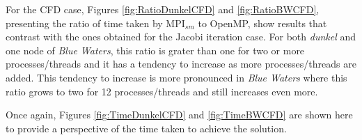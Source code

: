 For the CFD case, Figures \ref{fig:RatioDunkelCFD} and \ref{fig:RatioBWCFD}, presenting the ratio of time taken by MPI$_{sm}$ to OpenMP, show results that contrast with the ones obtained for the Jacobi iteration case. For both \emph{dunkel} and one node of \emph{Blue Waters}, this ratio is grater than one for two or more processes/threads and it has a tendency to increase as more processes/threads are added. This tendency to increase is more pronounced in \emph{Blue Waters} where this ratio grows to two for 12 processes/threads and still increases even more.

Once again, Figures \ref{fig:TimeDunkelCFD} and \ref{fig:TimeBWCFD} are shown here to provide a perspective of the time taken to achieve the solution. 

\medskip

\begin{comment}
\subsubsection*{Partial improvement using node topology}

Information about hardware threads, core, cache, socket topology can help to implement binding between cores and processes/threads. It is known that applications with frequent synchronization between "neighboring" processes/threads could profit from placing them close together. To test this idea, a simple tool called \emph{\textbf{taskset}} was used in \emph{dunkel} in a setting similar to the one used to produce Figure \ref{fig:Figure3}. This particular computer (\emph{dunkel}) has two sockets, each having 12 cores, for a total of 24 cores, each corresponding to the 24 processes/threads shown in Figures \ref{fig:Figure1} and \ref{fig:Figure3}. The 12 cores in one socket of \emph{dunkel} shared 30 Mbi of L3 cache. A new experiment was set to run within a single socket using the '-c 0-11' parameter of taskset. 

The results of this new experiment are shown in Figure \ref{fig:taskset}. Notice that only 12 processes/threads are uses. 

\medskip


\begin{figure} [h!]
    \centering
    \captionsetup{justification=raggedright, singlelinecheck=false}
    \begin{subfigure}{.6\textwidth}
      \hspace*{-1.5cm} 
      \texttt{[image: Plots/section3.2/dunkel-DP-1SoketRatio.pdf]}
      \caption{Computational Fluid Dynamic - Ratio MPI$_{sm}$ to OpenMP.}
      \label{fig:RatioDunkelCFD_Pin}
    \end{subfigure}%
    \begin{subfigure}{.6\textwidth}
      \hspace*{-1.5cm} 
      \texttt{[image: Plots/section3.2/dunkel-DP-1Soket.pdf]}
      \caption{Computational Fluid Dynamic - Execution time}
      \label{fig:TimeDunkelCFD_Pin}
    \end{subfigure}
\caption{Comparing shared memory programming models - CFD in \emph{dunkel}}
\label{fig:taskset}
\end{figure}


\end{comment}
